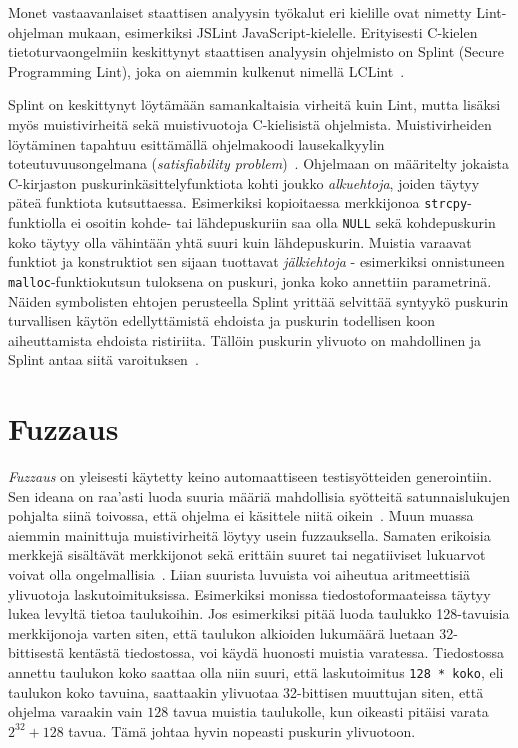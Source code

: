 Monet vastaavanlaiset staattisen analyysin työkalut eri kielille ovat nimetty
Lint-ohjelman mukaan, esimerkiksi JSLint JavaScript-kielelle.
Erityisesti C-kielen tietoturvaongelmiin keskittynyt staattisen analyysin ohjelmisto on Splint
(Secure Programming Lint), joka on aiemmin kulkenut nimellä LCLint~\cite{SplintLCLint}.

Splint on keskittynyt löytämään samankaltaisia virheitä kuin Lint,
mutta lisäksi myös muistivirheitä sekä muistivuotoja C-kielisistä ohjelmista.
Muistivirheiden löytäminen tapahtuu esittämällä ohjelmakoodi lausekalkyylin toteutuvuusongelmana
(\emph{satisfiability problem})~\cite{SplintLCLint}.
Ohjelmaan on määritelty jokaista C-kirjaston puskurinkäsittelyfunktiota kohti joukko
\emph{alkuehtoja}, joiden täytyy päteä funktiota kutsuttaessa.
Esimerkiksi kopioitaessa merkkijonoa \texttt{strcpy}-funktiolla ei osoitin kohde- tai lähdepuskuriin
saa olla \texttt{NULL} sekä kohdepuskurin koko täytyy olla vähintään yhtä suuri kuin lähdepuskurin.
Muistia varaavat funktiot ja konstruktiot sen sijaan tuottavat \emph{jälkiehtoja} -
esimerkiksi onnistuneen \texttt{malloc}-funktiokutsun tuloksena on puskuri, jonka
koko annettiin parametrinä.
Näiden symbolisten ehtojen perusteella Splint yrittää selvittää syntyykö
puskurin turvallisen käytön edellyttämistä ehdoista ja
puskurin todellisen koon aiheuttamista ehdoista ristiriita.
Tällöin puskurin ylivuoto on mahdollinen ja Splint antaa siitä varoituksen~\cite{SplintLCLint}.

\section{Fuzzaus}
\label{Fuzzaus}

\emph{Fuzzaus} on yleisesti käytetty keino automaattiseen testisyötteiden generointiin.
Sen ideana on raa'asti luoda suuria määriä mahdollisia syötteitä satunnaislukujen pohjalta siinä toivossa,
että ohjelma ei käsittele niitä oikein~\cite{UnixReliability}.
Muun muassa aiemmin mainittuja muistivirheitä löytyy usein fuzzauksella.
Samaten erikoisia merkkejä sisältävät merkkijonot sekä erittäin suuret tai negatiiviset lukuarvot
voivat olla ongelmallisia~\cite{ViolatingAssumptions}.
Liian suurista luvuista voi aiheutua aritmeettisiä ylivuotoja laskutoimituksissa.
Esimerkiksi monissa tiedostoformaateissa täytyy lukea levyltä tietoa taulukoihin.
Jos esimerkiksi pitää luoda taulukko 128-tavuisia merkkijonoja varten siten,
että taulukon alkioiden lukumäärä luetaan 32-bittisestä kentästä tiedostossa,
voi käydä huonosti muistia varatessa.
Tiedostossa annettu taulukon koko saattaa olla niin suuri,
että laskutoimitus \texttt{128 * koko}, eli taulukon koko tavuina,
saattaakin ylivuotaa 32-bittisen muuttujan siten,
että ohjelma varaakin vain $128$ tavua muistia taulukolle,
kun oikeasti pitäisi varata $2^{32} + 128$ tavua.
Tämä johtaa hyvin nopeasti puskurin ylivuotoon.

